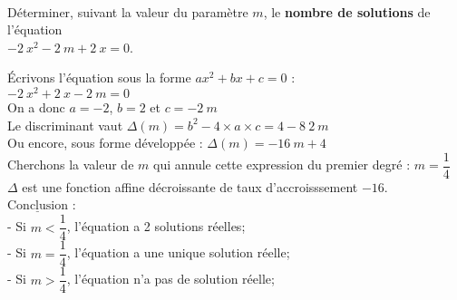 \documentclass[a4paper,11pt,exos]{nsi} %
\begin{document}



\maketitle\

\begin{exercice}
    Déterminer, suivant la valeur du paramètre $m$, le \textbf{nombre de solutions} de l'équation\\ $-2~x^{2}-2~m+2~x=0$.
\end{exercice}


Écrivons l'équation sous la forme $ax^2+bx+c=0$ :\\$-2~x^{2}+2~x-2~m=0$\\On a donc $a=-2$, $b=2$ et $c=-2~m$\\Le discriminant vaut $\Delta(m)=b^2-4\times a\times c = 4-8~2~m$\\Ou encore, sous forme développée : $\Delta(m) = -16~m+4$\\Cherchons la valeur de $m$ qui annule cette expression du premier degré : $m=\dfrac{1}{4}$\\$\Delta$ est une fonction affine décroissante de taux d'accroisssement $-16$.\\$\underline{\text{Conclusion}}$ :\\- Si $m < \dfrac{1}{4}$, l'équation a 2 solutions réelles;\\- Si $m = \dfrac{1}{4}$, l'équation a une unique solution réelle;\\- Si $m > \dfrac{1}{4}$, l'équation n'a pas de solution réelle;
\end{document}
